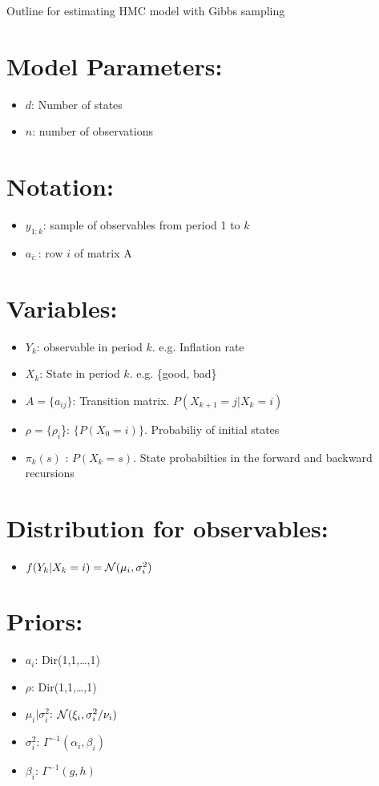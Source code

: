 \documentclass[12pt]{article}
\begin{document}
Outline for estimating HMC model with Gibbs sampling

\section*{Model Parameters:}
\begin{itemize}
  \item $d$: Number of states
  \item $n$: number of observations
\end{itemize}

\section*{Notation:}
\begin{itemize} 
  \item $y_{1:k}$: sample of observables from period 1 to $k$
  \item $a_{i:}$: row $i$ of matrix A
\end{itemize}

\section*{Variables:}
\begin{itemize} 
  \item $Y_k$: observable in period $k$. e.g. Inflation rate
  \item $X_k$: State in period $k$. e.g. \{good, bad\}
  \item $A=\{a_{ij}\}$: Transition matrix. $P(X_{k+1} = j|X_{k} = i)$ 
  \item $\rho = \{\rho_i$\}: $\{P(X_0 = i)\}$. Probabiliy of initial states 
  \item $\pi_{k}(s)$ : $P(X_k = s )$. State probabilties in the forward and backward recursions
\end{itemize}

\section*{Distribution for observables:}
\begin{itemize}
  \item $f(Y_k|X_k=i) = \operatorname{\mathcal{N}}(\mu_i, \sigma^2_i)$
\end{itemize}
 

\section*{Priors:}
\begin{itemize}
  \item $a_i$: Dir(1,1,\ldots,1)
  \item $\rho$: Dir(1,1,\ldots,1)
  \item $\mu_i| \sigma_i^2$: $\operatorname{\mathcal{N}}(\xi_i,\sigma_i^2/\nu_i)$
  \item $\sigma_i^{2}$: $\Gamma^{-1}(\alpha_i,\beta_i)$
  \item $\beta_i$: $\Gamma^{-1}(g,h)$
\end{itemize}
\end{document}
